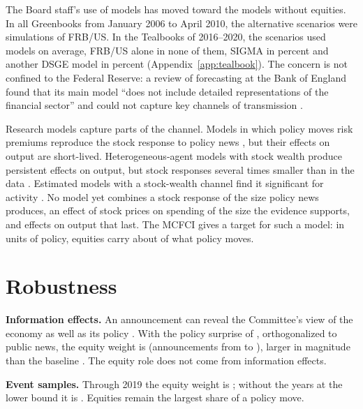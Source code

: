 \documentclass[11pt]{article}
\begin{document}


The Board staff's use of models has moved toward the models without equities. In all  Greenbooks from January 2006 to April 2010, the alternative scenarios were simulations of FRB/US. In the  Tealbooks of 2016--2020, the scenarios used  models on average, FRB/US alone in none of them, SIGMA in  percent and another DSGE model in  percent (Appendix~\ref{app:tealbook}). The concern is not confined to the Federal Reserve: a review of forecasting at the Bank of England found that its main model ``does not include detailed representations of the financial sector'' and could not capture key channels of transmission \citep{bernanke2024}.

Research models capture parts of the channel. Models in which policy moves risk premiums reproduce the stock response to policy news \citep{pflueger2022,kekre2022}, but their effects on output are short-lived. Heterogeneous-agent models with stock wealth produce persistent effects on output, but stock responses several times smaller than in the data \citep{auclert2020}. Estimated models with a stock-wealth channel find it significant for activity \citep{castelnuovo2010}. No model yet combines a stock response of the size policy news produces, an effect of stock prices on spending of the size the evidence supports, and effects on output that last. The MCFCI gives a target for such a model: in units of policy, equities carry about  of what policy moves.

\section{Robustness}\label{sec:robust}
\textbf{Information effects.} An announcement can reveal the Committee's view of the economy as well as its policy \citep{nakamura2018}. With the policy surprise of \citet{bauer2023aer}, orthogonalized to public news, the equity weight is  (announcements from  to ), larger in magnitude than the baseline . The equity role does not come from information effects.

\textbf{Event samples.} Through 2019 the equity weight is ; without the years at the lower bound it is . Equities remain the largest share of a policy move.
\end{document}
